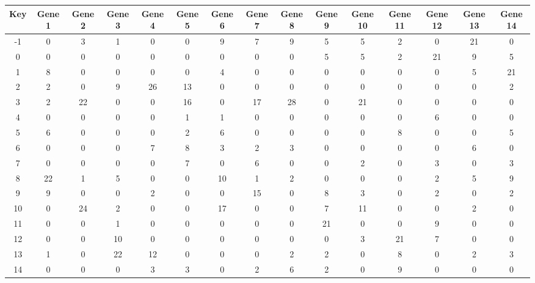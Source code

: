 \begin{tabular}{|c|c|c|c|c|c|c|c|c|c|c|c|c|c|c|}
\hline
Key & Gene 1 & Gene 2 & Gene 3 & Gene 4 & Gene 5 & Gene 6 & Gene 7 & Gene 8 & Gene 9 & Gene 10 & Gene 11 & Gene 12 & Gene 13 & Gene 14 \\
\hline
-1 & 0 & 3 & 1 & 0 & 0 & 9 & 7 & 9 & 5 & 5 & 2 & 0 & 21 & 0 \\
0 & 0 & 0 & 0 & 0 & 0 & 0 & 0 & 0 & 5 & 5 & 2 & 21 & 9 & 5 \\
1 & 8 & 0 & 0 & 0 & 0 & 4 & 0 & 0 & 0 & 0 & 0 & 0 & 5 & 21 \\
2 & 2 & 0 & 9 & 26 & 13 & 0 & 0 & 0 & 0 & 0 & 0 & 0 & 0 & 2 \\
3 & 2 & 22 & 0 & 0 & 16 & 0 & 17 & 28 & 0 & 21 & 0 & 0 & 0 & 0 \\
4 & 0 & 0 & 0 & 0 & 1 & 1 & 0 & 0 & 0 & 0 & 0 & 6 & 0 & 0 \\
5 & 6 & 0 & 0 & 0 & 2 & 6 & 0 & 0 & 0 & 0 & 8 & 0 & 0 & 5 \\
6 & 0 & 0 & 0 & 7 & 8 & 3 & 2 & 3 & 0 & 0 & 0 & 0 & 6 & 0 \\
7 & 0 & 0 & 0 & 0 & 7 & 0 & 6 & 0 & 0 & 2 & 0 & 3 & 0 & 3 \\
8 & 22 & 1 & 5 & 0 & 0 & 10 & 1 & 2 & 0 & 0 & 0 & 2 & 5 & 9 \\
9 & 9 & 0 & 0 & 2 & 0 & 0 & 15 & 0 & 8 & 3 & 0 & 2 & 0 & 2 \\
10 & 0 & 24 & 2 & 0 & 0 & 17 & 0 & 0 & 7 & 11 & 0 & 0 & 2 & 0 \\
11 & 0 & 0 & 1 & 0 & 0 & 0 & 0 & 0 & 21 & 0 & 0 & 9 & 0 & 0 \\
12 & 0 & 0 & 10 & 0 & 0 & 0 & 0 & 0 & 0 & 3 & 21 & 7 & 0 & 0 \\
13 & 1 & 0 & 22 & 12 & 0 & 0 & 0 & 2 & 2 & 0 & 8 & 0 & 2 & 3 \\
14 & 0 & 0 & 0 & 3 & 3 & 0 & 2 & 6 & 2 & 0 & 9 & 0 & 0 & 0 \\
\hline
\end{tabular}